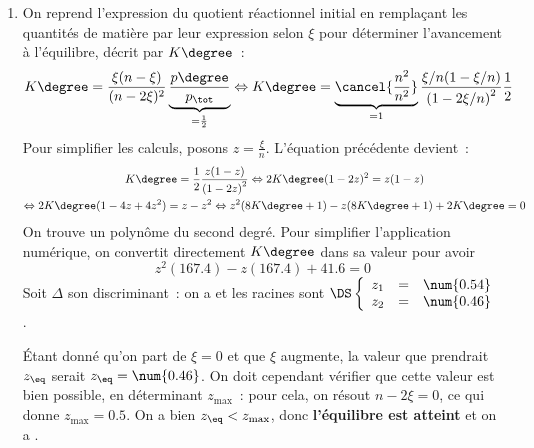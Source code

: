 \documentclass[a4paper, 12pt, final, garamond]{book}
\begin{document}
\begin{enumerate}[resume]
    \item[] On reprend l'expression du quotient réactionnel initial en
        remplaçant les quantités de matière par leur expression selon $\xi$ pour
        déterminer l'avancement à l'équilibre, décrit par $K\degree$~:
        \begin{gather*}
            K\degree = \frac{\xi(n-\xi)}{(n-2\xi)^2}
            \underbrace{\frac{p\degree}{p_{\tot}}}_{=\frac{1}{2}}
            \Leftrightarrow
            K\degree = \underbrace{\cancel{\frac{n^2}{n^2}}}_{=1}
                \frac{\xi/n(1-\xi/n)}
                {\left( 1 - 2\xi/n \right)^2} \frac{1}{2}\\
        \end{gather*}
        Pour simplifier les calculs, posons $z = \frac{\xi}{n}$. L'équation
        précédente devient~:
        \begin{gather*}
            K\degree = \frac{1}{2} \frac{z(1-z)}{\left( 1 - 2z \right)^2}
            \Leftrightarrow
            2K\degree(1-2z)^2 = z(1-z)\\
            \Leftrightarrow
            2K\degree(1-4z + 4z^2) = z - z^2
            \Leftrightarrow
            z^2(8K\degree +1) - z(8K\degree +1) + 2K\degree = 0
        \end{gather*}
        On trouve un polynôme du second degré. Pour simplifier l'application
        numérique, on convertit directement $K\degree$ dans sa valeur pour avoir
        \[\boxed{z^2(167.4) - z(167.4) + 41.6 = 0}\]
        Soit $\Delta$ son discriminant~: on a  et
        les racines sont
            $\DS\left\{
                \begin{array}{rcl}
                    z_1 & = & \num{0.54} \\
                    z_2 & = & \num{0.46}
                \end{array}
            \right.$.\bigbreak

        Étant donné qu'on part de $\xi = 0$ et que $\xi$ augmente, la valeur que
        prendrait $z_{\eq}$ serait $z_{\eq} = \num{0.46}$. On doit cependant
        vérifier que cette valeur est bien possible, en déterminant $z_{\max}$~:
        pour cela, on résout $n-2\xi = 0$, ce qui donne $z_{\max} = \num{0.5}$.
        On a bien $z_{\eq} < z_{\max}$, donc \textbf{l'équilibre est atteint} et
        on a .
\end{enumerate}
\end{document}
